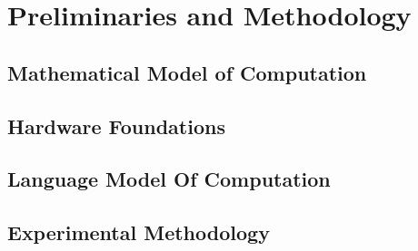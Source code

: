 \chapter{\label{chapter:preliminaries}Preliminaries and Methodology}

\section{\label{sec:mathematical-model}Mathematical Model of Computation}
\section{\label{sec:hardware-foundations}Hardware Foundations}
\section{\label{sec:practical-model}Language Model Of Computation}
\section{\label{sec:methodology}Experimental Methodology}